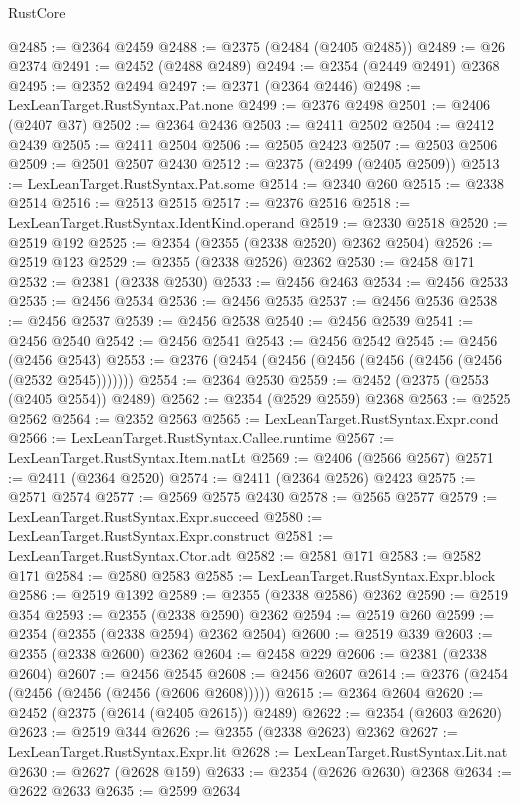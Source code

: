 \begin{lexlean}{RustCore}
\begin{coremodule}
@2485 := @2364 @2459
@2488 := @2375 (@2484 (@2405 @2485))
@2489 := @26 @2374
@2491 := @2452 (@2488 @2489)
@2494 := @2354 (@2449 @2491) @2368
@2495 := @2352 @2494
@2497 := @2371 (@2364 @2446)
@2498 := LexLeanTarget.RustSyntax.Pat.none
@2499 := @2376 @2498
@2501 := @2406 (@2407 @37)
@2502 := @2364 @2436
@2503 := @2411 @2502
@2504 := @2412 @2439
@2505 := @2411 @2504
@2506 := @2505 @2423
@2507 := @2503 @2506
@2509 := @2501 @2507 @2430
@2512 := @2375 (@2499 (@2405 @2509))
@2513 := LexLeanTarget.RustSyntax.Pat.some
@2514 := @2340 @260
@2515 := @2338 @2514
@2516 := @2513 @2515
@2517 := @2376 @2516
@2518 := LexLeanTarget.RustSyntax.IdentKind.operand
@2519 := @2330 @2518
@2520 := @2519 @192
@2525 := @2354 (@2355 (@2338 @2520) @2362 @2504)
@2526 := @2519 @123
@2529 := @2355 (@2338 @2526) @2362
@2530 := @2458 @171
@2532 := @2381 (@2338 @2530)
@2533 := @2456 @2463
@2534 := @2456 @2533
@2535 := @2456 @2534
@2536 := @2456 @2535
@2537 := @2456 @2536
@2538 := @2456 @2537
@2539 := @2456 @2538
@2540 := @2456 @2539
@2541 := @2456 @2540
@2542 := @2456 @2541
@2543 := @2456 @2542
@2545 := @2456 (@2456 @2543)
@2553 := @2376 (@2454 (@2456 (@2456 (@2456 (@2456 (@2456 (@2532 @2545)))))))
@2554 := @2364 @2530
@2559 := @2452 (@2375 (@2553 (@2405 @2554)) @2489)
@2562 := @2354 (@2529 @2559) @2368
@2563 := @2525 @2562
@2564 := @2352 @2563
@2565 := LexLeanTarget.RustSyntax.Expr.cond
@2566 := LexLeanTarget.RustSyntax.Callee.runtime
@2567 := LexLeanTarget.RustSyntax.Item.natLt
@2569 := @2406 (@2566 @2567)
@2571 := @2411 (@2364 @2520)
@2574 := @2411 (@2364 @2526) @2423
@2575 := @2571 @2574
@2577 := @2569 @2575 @2430
@2578 := @2565 @2577
@2579 := LexLeanTarget.RustSyntax.Expr.succeed
@2580 := LexLeanTarget.RustSyntax.Expr.construct
@2581 := LexLeanTarget.RustSyntax.Ctor.adt
@2582 := @2581 @171
@2583 := @2582 @171
@2584 := @2580 @2583
@2585 := LexLeanTarget.RustSyntax.Expr.block
@2586 := @2519 @1392
@2589 := @2355 (@2338 @2586) @2362
@2590 := @2519 @354
@2593 := @2355 (@2338 @2590) @2362
@2594 := @2519 @260
@2599 := @2354 (@2355 (@2338 @2594) @2362 @2504)
@2600 := @2519 @339
@2603 := @2355 (@2338 @2600) @2362
@2604 := @2458 @229
@2606 := @2381 (@2338 @2604)
@2607 := @2456 @2545
@2608 := @2456 @2607
@2614 := @2376 (@2454 (@2456 (@2456 (@2456 (@2606 @2608)))))
@2615 := @2364 @2604
@2620 := @2452 (@2375 (@2614 (@2405 @2615)) @2489)
@2622 := @2354 (@2603 @2620)
@2623 := @2519 @344
@2626 := @2355 (@2338 @2623) @2362
@2627 := LexLeanTarget.RustSyntax.Expr.lit
@2628 := LexLeanTarget.RustSyntax.Lit.nat
@2630 := @2627 (@2628 @159)
@2633 := @2354 (@2626 @2630) @2368
@2634 := @2622 @2633
@2635 := @2599 @2634

\end{coremodule}
\end{lexlean}
